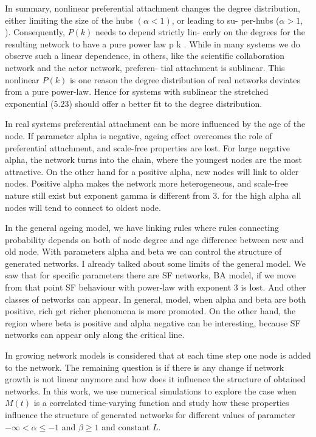 In summary, nonlinear preferential attachment changes the degree
distribution, either limiting the size of the hubs $(\alpha < 1)$, or leading to su-
per-hubs ($\alpha > 1$, ). Consequently, $P(k)$ needs to depend strictly lin-
early on the degrees for the resulting network to have a pure power law p k .
While in many systems we do observe such a linear dependence, in others,
like the scientific collaboration network and the actor network, preferen-
tial attachment is sublinear. This nonlinear $P(k)$ is one reason the degree
distribution of real networks deviates from a pure power-law. Hence for
systems with sublinear  the stretched exponential (5.23) should offer a
better fit to the degree distribution.


In real systems preferential attachment can be more influenced by the age of the node. If parameter alpha is negative, ageing effect overcomes the role of preferential attachment, and scale-free properties are lost. For large negative alpha, the network turns into the chain, where the youngest nodes are the most attractive. On the other hand for a positive alpha, new nodes will link to older nodes. Positive alpha makes the network more heterogeneous, and scale-free nature still exist but exponent gamma is different from 3.  for the high alpha all nodes will tend to connect to oldest node. 

In the general ageing model, we have linking rules where rules connecting probability depends on both of node degree and age difference between new and old node.  With parameters alpha and beta we can control the structure of generated networks. I already talked about some limits of the general model. We saw that for specific parameters there are SF networks, BA model, if we move from that point SF behaviour with power-law with exponent 3 is lost. And other classes of networks can appear. In general, model, when alpha and beta are both positive, rich get richer phenomena is more promoted. On the other hand, the region where beta is positive and alpha negative can be interesting, because SF networks can appear only along the critical line. 

In growing network models is considered that at each time step one node is added to the network. The remaining question is if there is any change if network growth is not linear anymore and how does it influence the structure of obtained networks.  In this work, we use numerical simulations to explore the case when $M(t)$ is a correlated time-varying function and study how these properties influence the structure of generated networks for different values of parameter $-\infty<\alpha\leq-1$ and $\beta\geq1$ and constant $L$.

